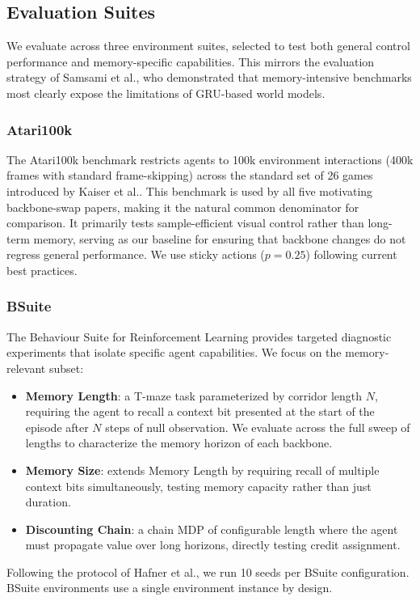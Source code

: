 \documentclass{article}
\begin{document}
\subsection{Evaluation Suites}
We evaluate across three environment suites, selected to test both
general control performance and memory-specific capabilities. This
mirrors the evaluation strategy of Samsami et al.\cite{memory}, who
demonstrated that memory-intensive benchmarks most clearly expose
the limitations of GRU-based world models.

\subsubsection{Atari100k}
The Atari100k benchmark\cite{atari,simple} restricts agents to 100k
environment interactions (400k frames with standard frame-skipping)
across the standard set of 26 games introduced by Kaiser et
al.\cite{simple}. This benchmark is used by all five motivating
backbone-swap papers, making it the natural common denominator for
comparison. It primarily tests sample-efficient visual control rather
than long-term memory, serving as our baseline for ensuring that
backbone changes do not regress general performance. We use sticky
actions ($p = 0.25$) following current best practices\cite{machado}.

\subsubsection{BSuite}
The Behaviour Suite for Reinforcement Learning\cite{bsuite} provides
targeted diagnostic experiments that isolate specific agent
capabilities. We focus on the memory-relevant subset:
\begin{itemize}
    \item \textbf{Memory Length}: a T-maze task parameterized by
          corridor length $N$, requiring the agent to recall a context
          bit presented at the start of the episode after $N$ steps of
          null observation. We evaluate across the full sweep of
          lengths to characterize the memory horizon of each backbone.
    \item \textbf{Memory Size}: extends Memory Length by requiring
          recall of multiple context bits simultaneously, testing
          memory capacity rather than just duration.
    \item \textbf{Discounting Chain}: a chain MDP of configurable
          length where the agent must propagate value over long
          horizons, directly testing credit assignment.
\end{itemize}
Following the protocol of Hafner et al.\cite{dreamer}, we run 10
seeds per BSuite configuration. BSuite environments use a single
environment instance by design.
\end{document}
